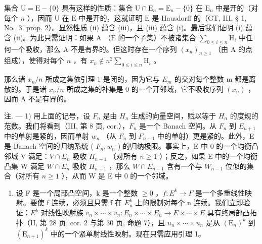 集合 \(\mathrm{U} = \mathrm{E} - \{0\}\) 具有这样的性质：集合 \(\mathrm{U} \cap \mathrm{E}_n = \mathrm{E}_n - \{0\}\) 在 \(\mathrm{E}_n\) 中是开的（对每个 \(n\) ），因而 \(\mathrm{U}\) 在 \(\mathrm{E}\) 中是开的，这就证明 \(\mathrm{E}\) 是 Hausdorff 的（GT, III, § 1, No.~3, prop. 2）。显然性质 (ii) 蕴含 (iii)，且 (iii) 蕴含 (i)。最后我们证明 (i) 蕴含 (ii)。为此只需证明：如果 \(\mathrm{A}\) （\(\mathrm{E}\) 的一个子集）不被诸集合 \(\sum_{0 \leqslant i \leqslant n} \mathrm{H}_i\) 中任何一个吸收，那么 \(\mathrm{A}\) 不是有界的。但这时存在一个序列 \((x_n)_{n \geqslant 1}\) （由 \(\mathrm{A}\) 的点组成），使得对每个 \(n\) ，有 \(x_n \notin n^2 \sum_{0 \leqslant i \leqslant n} \mathrm{H}_i\) 。

那么诸 \(x_{n}/n\) 所成之集依引理 1 是闭的，因为它与 \(E_{m}\) 的交对每个整数 m 都是离散的。于是诸 \(x_{n}/n\) 所成之集的补集是 0 的一个开邻域，它不吸收序列 \((x_{n})\) ，因而 A 不是有界的。

注. --- 1) 用上面的记号，设 \(F_{n}\) 是由 \(H_{n}\) 生成的向量空间，赋以等于 \(H_{n}\) 的度规的范数。我们将看到（III, 第 8 页, cor.），\(F_{n}\) 是一个 Banach 空间。从 \(F_{n}\) 到 \(E_{n+1}\) 中的单射是紧的，因而单射 \(w_{n}\) （从 \(F_{n}\) 到 \(F_{n+1}\) 中的单射）更是紧的。此外，E 是 Banach 空间的归纳系统 ( \(F_{n}, w_{n}\) ) 的归纳极限。事实上，E 中 0 的一个均衡凸邻域 V 满足：\(V \cap E_{n}\) 吸收 \(H_{n-1}\) （对所有 \(n \geqslant 1\) ）；反之，如果 E 中的一个均衡凸集 W 满足 \(W \cap E_{n}\) 吸收 \(H_{n-1}\) ，那么 \(W \cap E_{n-1}\) 含有一个与 \(W_{n-1}\) 位似的集合（对所有 \(n \geqslant 1\) ），从而 W 是 E 中 0 的一个邻域。

\begin{enumerate}
\def\labelenumi{\arabic{enumi})}
\setcounter{enumi}{1}
\tightlist
\item
  设 F 是一个局部凸空间，k 是一个整数 \(\geqslant0\) ，\(f:E^{k}\rightarrow F\) 是一个多重线性映射。要使 f 连续，必须且只需 f 在 \(E_{n}^{k}\) 上的限制对每个 n 连续。我们立即验证：\(E^{k}\) 对线性映射族 \(v_{n}\times\cdots\times v_{n}:E_{n}\times\cdots\times E_{n}\to E\times\cdots\times E\) 具有终局部凸拓扑（II, 第 28 页, cor. 2 与第 30 页, 命题 7），且 \(u_{n}\times\cdots\times u_{n}\) 是从 \((\mathrm{E}_{n})^{k}\) 到 \((\mathrm{E}_{n+1})^{k}\) 中的一个紧单射线性映射。现在只需应用引理 1。
\end{enumerate}
